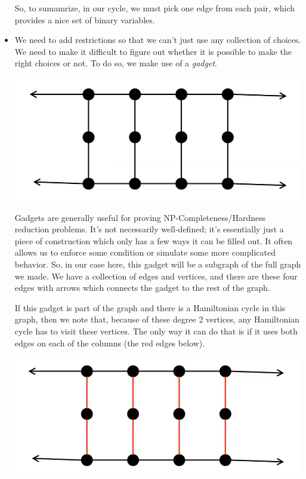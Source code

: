 \documentclass[letterpaper]{article}
\begin{document}
\begin{itemize}
    \bigskip 

    So, to sumamrize, in our cycle, we must pick one edge from each pair, which provides a nice set of binary variables. 

    \item We need to add restrictions so that we can't just use any collection of choices. We need to make it difficult to figure out whether it is possible to make the right choices or not. To do so, we make use of a \emph{gadget}. 
    \begin{center}
        \includegraphics[scale=0.35]{assets/zoe_ham_3.png}
    \end{center}
    Gadgets are generally useful for proving NP-Completeness/Hardness reduction problems. It's not necessarily well-defined; it's essentially just a piece of construction which only has a few ways it can be filled out. It often allows us to enforce some condition or simulate some more complicated behavior. So, in our case here, this gadget will be a subgraph of the full graph we made. We have a collection of edges and vertices, and there are these four edges with arrows which connects the gadget to the rest of the graph.
    
    \bigskip 

    If this gadget is part of the graph and there is a Hamiltonian cycle in this graph, then we note that, because of these degree 2 vertices, any Hamiltonian cycle has to visit these vertices. The only way it can do that is if it uses both edges on each of the columns (the red edges below).
    \begin{center}
        \includegraphics[scale=0.35]{assets/zoe_ham_4.png}
    \end{center}


\end{itemize}
\end{document}
